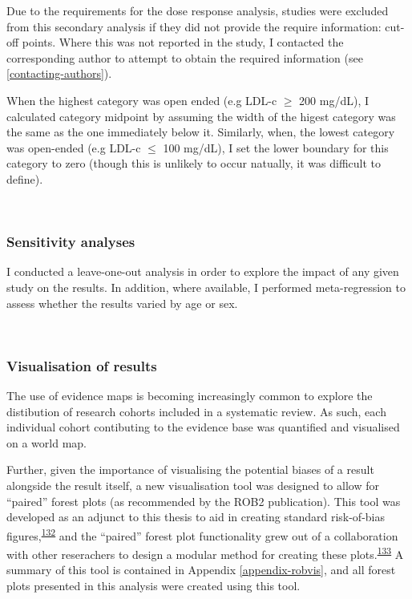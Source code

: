 \documentclass[a4paper, twoside]{templates/ociamthesis}
\begin{document}
Due to the requirements for the dose response analysis, studies were excluded from this secondary analysis if they did not provide the require information: cut-off points. Where this was not reported in the study, I contacted the corresponding author to attempt to obtain the required information (see \ref{contacting-authors}).

When the highest category was open ended (e.g LDL-c \(\geqslant\) 200 mg/dL), I calculated category midpoint by assuming the width of the higest category was the same as the one immediately below it. Similarly, when, the lowest category was open-ended (e.g LDL-c \(\leqslant\) 100 mg/dL), I set the lower boundary for this category to zero (though this is unlikely to occur natually, it was difficult to define).

~

\hypertarget{sensitivity-analyses}{%
\subsubsection{Sensitivity analyses}\label{sensitivity-analyses}}

I conducted a leave-one-out analysis in order to explore the impact of any given study on the results. In addition, where available, I performed meta-regression to assess whether the results varied by age or sex.

~

\hypertarget{visualisation-of-results}{%
\subsubsection{Visualisation of results}\label{visualisation-of-results}}

The use of evidence maps is becoming increasingly common to explore the distibution of research cohorts included in a systematic review. As such, each individual cohort contibuting to the evidence base was quantified and visualised on a world map.

Further, given the importance of visualising the potential biases of a result alongside the result itself, a new visualisation tool was designed to allow for ``paired'' forest plots (as recommended by the ROB2 publication). This tool was developed as an adjunct to this thesis to aid in creating standard risk-of-bias figures,\textsuperscript{\protect\hyperlink{ref-mcguinness2020robvisPaper}{132}} and the ``paired'' forest plot functionality grew out of a collaboration with other reserachers to design a modular method for creating these plots.\textsuperscript{\protect\hyperlink{ref-zotero-14999}{133}} A summary of this tool is contained in Appendix \ref{appendix-robvis}, and all forest plots presented in this analysis were created using this tool.
\end{document}

